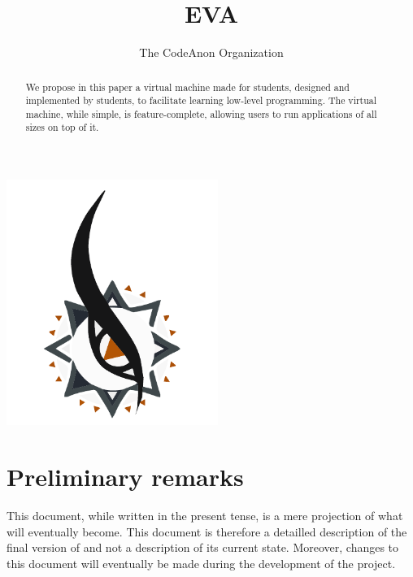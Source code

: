 \documentclass[11pt,twoside]{article}
\begin{document}
  \title{EVA}
  \author{The CodeAnon Organization}

  \maketitle
  \begin{abstract}
    We propose in this paper a virtual machine made for students, designed and implemented by students, to facilitate learning low-level programming. The virtual machine, while simple, is feature-complete, allowing users to run applications of all sizes on top of it.
  \end{abstract}
  \vfill
  \begin{center}
    \includegraphics[height=8cm]{logo_graph.pdf}
  \end{center}
  \vfill

  \cleardoublepage

  \hspace{0pt}
  \vfill

  \section*{Preliminary remarks}

  This document, while written in the present tense, is a mere projection of what  will eventually become. This document is therefore a detailled description of the final version of  and not a description of its current state. Moreover, changes to this document will eventually be made during the development of the project.

  \vfill

  \clearpage

  \tableofcontents
  \cleardoublepage

  \hspace{0pt}
  \vfill
\end{document}

